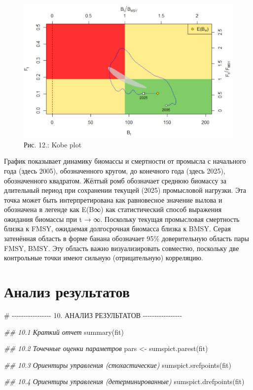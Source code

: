 \documentclass[
  letterpaper,
  DIV=11,
  numbers=noendperiod]{scrreprt}
\newenvironment{Shaded}{\begin{snugshade}}{\end{snugshade}}
\newcommand{\CommentTok}[1]{\textcolor[rgb]{0.37,0.37,0.37}{#1}}
\newcommand{\DocumentationTok}[1]{\textcolor[rgb]{0.37,0.37,0.37}{\textit{#1}}}
\newcommand{\FunctionTok}[1]{\textcolor[rgb]{0.28,0.35,0.67}{#1}}
\newcommand{\NormalTok}[1]{\textcolor[rgb]{0.00,0.23,0.31}{#1}}
\newcommand{\OtherTok}[1]{\textcolor[rgb]{0.00,0.23,0.31}{#1}}
\begin{document}
\begin{figure}[H]

{\centering \includegraphics[width=0.6\linewidth,height=\textheight,keepaspectratio]{images/SPICT12.PNG}

}

\caption{Рис. 12.: Kobe plot}

\end{figure}%

График показывает динамику биомассы и смертности от промысла с
начального года (здесь 2005), обозначенного кругом, до конечного года
(здесь 2025), обозначенного квадратом. Жёлтый ромб обозначает среднюю
биомассу за длительный период при сохранении текущей (2025) промысловой
нагрузки. Эта точка может быть интерпретирована как равновесное значение
вылова и обозначена в легенде как E(B∞) как статистический способ
выражения ожидания биомассы при t → ∞. Поскольку текущая промысловая
смертность близка к FMSY, ожидаемая долгосрочная биомасса близка к BMSY.
Серая затенённая область в форме банана обозначает 95\% доверительную
область пары FMSY, BMSY. Эту область важно визуализировать совместно,
поскольку две контрольные точки имеют сильную (отрицательную)
корреляцию.

\section{Анализ
результатов}\label{ux430ux43dux430ux43bux438ux437-ux440ux435ux437ux443ux43bux44cux442ux430ux442ux43eux432}

\begin{Shaded}
\begin{Highlighting}[]
\CommentTok{\# {-}{-}{-}{-}{-}{-}{-}{-}{-}{-}{-}{-}{-}{-}{-}{-}{-} 10. АНАЛИЗ РЕЗУЛЬТАТОВ {-}{-}{-}{-}{-}{-}{-}{-}{-}{-}{-}{-}{-}{-}{-}{-}{-}}

\DocumentationTok{\#\# 10.1 Краткий отчет}
\FunctionTok{summary}\NormalTok{(fit)}

\DocumentationTok{\#\# 10.2 Точечные оценки параметров}
\NormalTok{pars }\OtherTok{\textless{}{-}} \FunctionTok{sumspict.parest}\NormalTok{(fit)}

\DocumentationTok{\#\# 10.3 Ориентиры управления (стохастические)}
\FunctionTok{sumspict.srefpoints}\NormalTok{(fit)}

\DocumentationTok{\#\# 10.4 Ориентиры управления (детерминированные)}
\FunctionTok{sumspict.drefpoints}\NormalTok{(fit)}
\end{Highlighting}
\end{Shaded}
\end{document}
